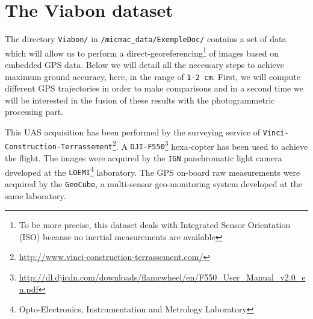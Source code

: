 \section{The Viabon dataset}
The directory {\tt Viabon/} in {\tt /micmac\_data/ExempleDoc/} contains a set of data which will allow us to perform a direct-georeferencing\footnote{To be more precise, this dataset deals with Integrated Sensor Orientation (ISO) because no inertial measurements are available} of images based on embedded GPS data. Below we will detail all the necessary steps to achieve maximum ground accuracy, here, in the range of {\tt 1-2 cm}. First, we will compute different GPS trajectories in order to make comparisons and in a second time we will be interested in the fusion of these results with the photogrammetric processing part.\newline

This UAS acquisition has been performed by the surveying service of {\tt Vinci-Construction-Terrassement}\footnote{\url{http://www.vinci-construction-terrassement.com/}}. A {\tt DJI-F550}\footnote{\url{http://dl.djicdn.com/downloads/flamewheel/en/F550_User_Manual_v2.0_en.pdf}} hexa-copter has been used to achieve the flight. The images were acquired by the {\tt IGN} panchromatic light camera developed at the {\tt LOEMI}\footnote{Opto-Electronics, Instrumentation and Metrology Laboratory} laboratory. The GPS on-board raw measurements were acquired by the {\tt GeoCube}, a multi-sensor geo-monitoring system developed at the same laboratory.\newline

